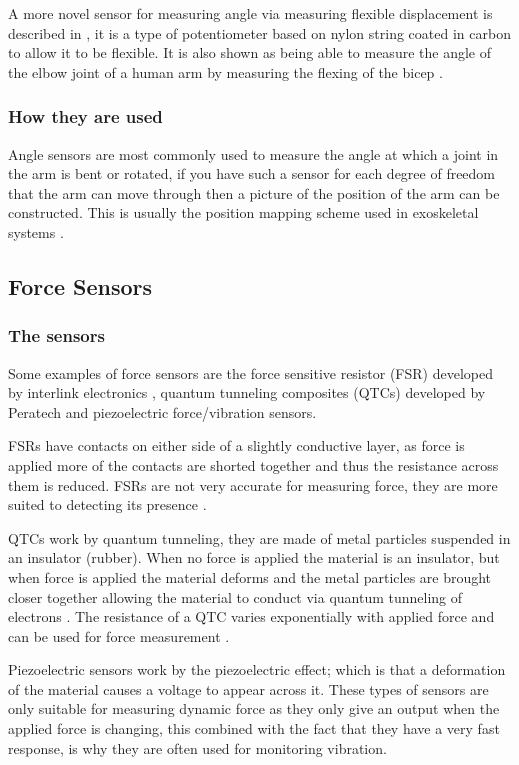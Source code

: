 \documentclass[journal]{IEEEtran}
\begin{document}
A more novel sensor for measuring angle via measuring flexible displacement is described in \cite{flexiSensor}, 
it is a type of potentiometer based on nylon string coated in carbon to allow it to be flexible. It is also shown as 
being able to measure the angle of the elbow joint of a human arm by measuring the flexing of the bicep \cite{flexiSensor}.

\subsubsection{How they are used}
Angle sensors are most commonly used to measure the angle at which a joint in the arm is bent or 
rotated, if you have such a sensor for each degree of freedom that the arm can move through then a 
picture of the position of the arm can be constructed. This is usually the position mapping scheme 
used in exoskeletal systems \cite{AdvancesPush}.

\subsection{Force Sensors}
\subsubsection{The sensors}
Some examples of force sensors are the force sensitive resistor (FSR) developed by interlink 
electronics \cite{FSR,Interlink}, quantum tunneling composites (QTCs) developed by Peratech \cite{QTCs} and 
piezoelectric force/vibration sensors.

FSRs have contacts on either side of a slightly conductive layer, as force is applied more of 
the contacts are shorted together and thus the resistance across them is reduced. FSRs 
are not very accurate for measuring force, they are more suited to detecting its presence \cite{FSR}.

QTCs work by quantum tunneling, they are made of metal particles suspended in an insulator 
(rubber). When no force is applied the material is an insulator, but when force is applied the 
material deforms and the metal particles are brought closer together allowing the material to 
conduct via quantum tunneling of electrons \cite{QTCs}. The resistance of a QTC varies 
exponentially with applied force and can be used for force measurement \cite{QTCs}.

Piezoelectric sensors work by the piezoelectric effect; which is that a deformation of the material 
causes a voltage to appear across it. These types of sensors are only suitable for measuring 
dynamic force as they only give an output when the applied force is changing, this combined 
with the fact that they have a very fast response, is why they are often used for monitoring 
vibration.
\end{document}
